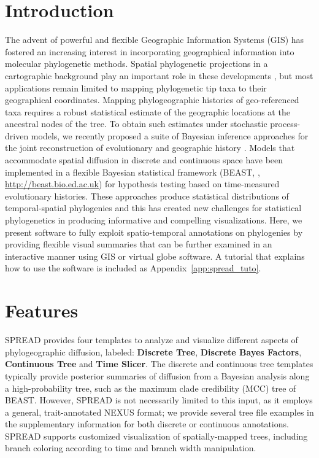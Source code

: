 \section{Introduction}

The advent of powerful and flexible Geographic Information Systems (GIS) has fostered an increasing interest in incorporating geographical information into molecular phylogenetic methods.
Spatial phylogenetic projections in a cartographic background play an important role in these developments \citep{Kidd2006, Parks2009}, but most applications remain limited to mapping phylogenetic tip taxa to their geographical coordinates.
Mapping phylogeographic histories of geo-referenced taxa requires a robust statistical estimate of the geographic locations at the ancestral nodes of the tree. 
To obtain such estimates under stochastic process-driven models, we recently proposed a suite of Bayesian inference approaches for the joint reconstruction of evolutionary and geographic history \citep{Lemey2009,Lemey2010, Bloomquist2010}.
Models that accommodate spatial diffusion in discrete and continuous space have been implemented in a flexible Bayesian statistical framework (BEAST, \cite{Drummond2007}, \url{http://beast.bio.ed.ac.uk}) for hypothesis testing based on time-measured evolutionary histories.
These approaches produce statistical distributions of temporal-spatial phylogenies and this has created new challenges for statistical phylogenetics in producing informative and compelling visualizations.
Here, we present software to fully exploit spatio-temporal annotations on phylogenies by providing flexible visual summaries that can be further examined in an interactive manner using GIS or virtual globe software.
A tutorial that explains how to use the software is included as Appendix~\ref{app:spread_tuto}.

\section{Features}

SPREAD provides four templates to analyze and visualize different aspects of phylogeographic diffusion, labeled: \textbf{Discrete Tree}, \textbf{Discrete Bayes Factors}, \textbf{Continuous Tree} and \textbf{Time Slicer}.
The discrete and continuous tree templates typically provide posterior summaries of diffusion from a Bayesian analysis along a \newline 
high-probability tree, such as the maximum clade credibility (MCC) tree of BEAST. 
However, SPREAD is not necessarily limited to this input, as it employs a general, trait-annotated NEXUS format; we provide several tree file examples in the supplementary information for both discrete or continuous annotations. 
SPREAD supports customized visualization of spatially-mapped trees, including branch coloring according to time and branch width manipulation.

